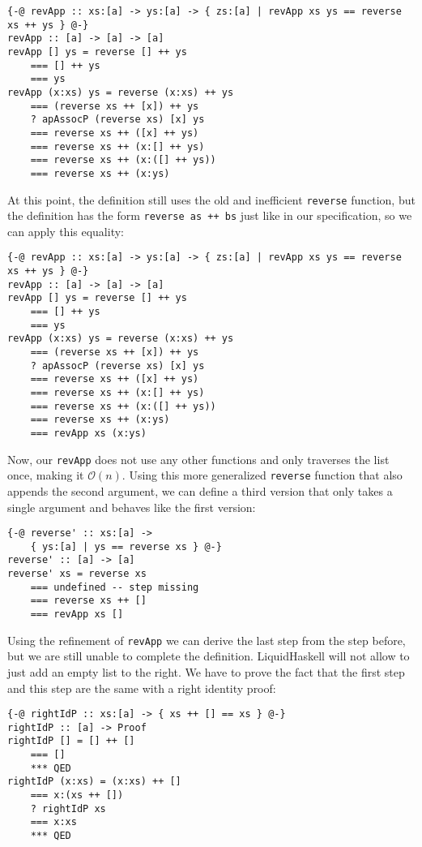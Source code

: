 \documentclass[acmlarge,screen,authorversion=true,nonacm=true]{acmart}
\renewcommand\O[1]{$\mathcal{O}(#1)$}
\begin{document}
\begin{lstlisting}
{-@ revApp :: xs:[a] -> ys:[a] -> { zs:[a] | revApp xs ys == reverse xs ++ ys } @-}
revApp :: [a] -> [a] -> [a]
revApp [] ys = reverse [] ++ ys
    === [] ++ ys
    === ys
revApp (x:xs) ys = reverse (x:xs) ++ ys
    === (reverse xs ++ [x]) ++ ys
    ? apAssocP (reverse xs) [x] ys
    === reverse xs ++ ([x] ++ ys)
    === reverse xs ++ (x:[] ++ ys)
    === reverse xs ++ (x:([] ++ ys))
    === reverse xs ++ (x:ys)
\end{lstlisting}

At this point, the definition still uses the old and inefficient \texttt{reverse} function, but the definition has the form \texttt{reverse as ++ bs} just like in our specification, so we can apply this equality:

\begin{lstlisting}
{-@ revApp :: xs:[a] -> ys:[a] -> { zs:[a] | revApp xs ys == reverse xs ++ ys } @-}
revApp :: [a] -> [a] -> [a]
revApp [] ys = reverse [] ++ ys
    === [] ++ ys
    === ys
revApp (x:xs) ys = reverse (x:xs) ++ ys
    === (reverse xs ++ [x]) ++ ys
    ? apAssocP (reverse xs) [x] ys
    === reverse xs ++ ([x] ++ ys)
    === reverse xs ++ (x:[] ++ ys)
    === reverse xs ++ (x:([] ++ ys))
    === reverse xs ++ (x:ys)
    === revApp xs (x:ys)
\end{lstlisting}

Now, our \texttt{revApp} does not use any other functions and only traverses the list once, making it \O{n}. Using this more generalized \texttt{reverse} function that also appends the second argument, we can define a third version that only takes a single argument and behaves like the first version:

\begin{lstlisting}
{-@ reverse' :: xs:[a] ->
    { ys:[a] | ys == reverse xs } @-}
reverse' :: [a] -> [a]
reverse' xs = reverse xs
    === undefined -- step missing
    === reverse xs ++ []
    === revApp xs []
\end{lstlisting}

Using the refinement of \texttt{revApp} we can derive the last step from the step before, but we are still unable to complete the definition. LiquidHaskell will not allow to just add an empty list to the right. We have to prove the fact that the first step and this step are the same with a right identity proof:

\begin{lstlisting}
{-@ rightIdP :: xs:[a] -> { xs ++ [] == xs } @-}
rightIdP :: [a] -> Proof
rightIdP [] = [] ++ []
    === []
    *** QED
rightIdP (x:xs) = (x:xs) ++ []
    === x:(xs ++ [])
    ? rightIdP xs
    === x:xs
    *** QED
\end{lstlisting}
\end{document}

